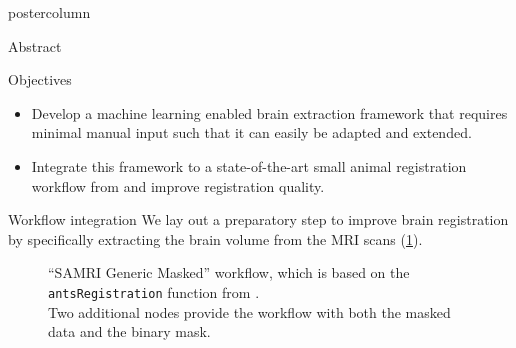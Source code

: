     \begin{frame}
        \vspace{2cm}
        \begin{columns}
            \begin{column}{.42\textwidth}
                \begin{beamercolorbox}[center]{postercolumn}
                    \begin{minipage}{.98\textwidth}  %
                        \parbox[t][\columnheight]{\textwidth}{ %
                            \begin{myblock}{Abstract}
                                
                            \end{myblock}\vfill

                            \begin{myblock}{Objectives}
                                \begin{itemize}
                                    \item Develop a machine learning enabled brain extraction framework that requires minimal manual input such that it can easily be adapted and extended.
                                    \item Integrate this framework to a state-of-the-art small animal registration workflow from \cite{irsabi} and improve registration quality.
                                \end{itemize}
                            \end{myblock}

                            \begin{myblock}{Workflow integration}
                                We lay out a preparatory step to improve brain registration by specifically extracting the brain volume from the MRI scans (\cref{masked_worklfow_graph}).
                                \begin{figure}
                                    \centering
                                    \caption{
                                        “SAMRI Generic Masked” workflow, which is based on the \textcolor{mg}{\texttt{antsRegistration}} function from \cite{irsabi}.\\
                                        Two additional nodes provide the workflow with both the masked data and the binary mask.
                                    }
                                    \label{masked_worklfow_graph}
                                \end{figure}


\end{myblock}}
\end{minipage}
\end{beamercolorbox}
\end{column}
\end{columns}
\end{frame}
